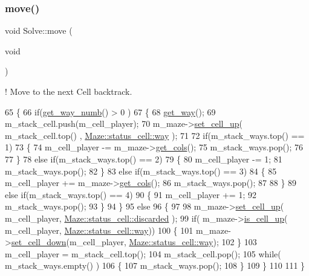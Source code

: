 \subsubsection{\texorpdfstring{move()}{move()}}
{\footnotesize\ttfamily void Solve\+::move (\begin{DoxyParamCaption}\item[{void}]{ }\end{DoxyParamCaption})}



! Move to the next Cell backtrack. 


\begin{DoxyCode}
65 \{
66     \textcolor{keywordflow}{if}(\hyperlink{classSolve_aaccff68d3e175f7400a9407077db7255}{get\_way\_numb}() > 0 )
67     \{
68         \hyperlink{classSolve_a963b593c0311f03c7e4ce77eea818fa1}{get\_way}();
69         m\_stack\_cell.push(m\_cell\_player);
70         m\_maze->\hyperlink{classMaze_aa7c832a91a3db8f48b31f688332f8986}{set\_cell\_up}( m\_stack\_cell.top() , 
      \hyperlink{classMaze_a07167e321eac2b67100fb82ecb98f1d1ac83b72dd001482ce10f0b106c7a0ed0e}{Maze::status\_cell::way} );
71 
72         \textcolor{keywordflow}{if}(m\_stack\_ways.top() == 1)
73         \{
74             m\_cell\_player -= m\_maze->\hyperlink{classMaze_a8a04cd1335e96a80358181afa164d4c9}{get\_cols}();
75             m\_stack\_ways.pop();
76 
77         \}
78         \textcolor{keywordflow}{else} \textcolor{keywordflow}{if}(m\_stack\_ways.top() == 2)
79         \{
80             m\_cell\_player -= 1;
81             m\_stack\_ways.pop();
82         \}
83         \textcolor{keywordflow}{else} \textcolor{keywordflow}{if}(m\_stack\_ways.top() == 3)
84         \{
85             m\_cell\_player += m\_maze->\hyperlink{classMaze_a8a04cd1335e96a80358181afa164d4c9}{get\_cols}();
86             m\_stack\_ways.pop();
87 
88         \}
89         \textcolor{keywordflow}{else} \textcolor{keywordflow}{if}(m\_stack\_ways.top() == 4)
90         \{
91             m\_cell\_player += 1;
92             m\_stack\_ways.pop();
93         \}
94     \}
95     \textcolor{keywordflow}{else}
96     \{
97 
98         m\_maze->\hyperlink{classMaze_aa7c832a91a3db8f48b31f688332f8986}{set\_cell\_up}( m\_cell\_player, 
      \hyperlink{classMaze_a07167e321eac2b67100fb82ecb98f1d1a94708897ec9db8647dfe695714c98e46}{Maze::status\_cell::discarded} );
99         \textcolor{keywordflow}{if}( m\_maze->\hyperlink{classMaze_a2b0e69e72d6c3e1037578f057946a21e}{is\_cell\_up}( m\_cell\_player, \hyperlink{classMaze_a07167e321eac2b67100fb82ecb98f1d1ac83b72dd001482ce10f0b106c7a0ed0e}{Maze::status\_cell::way}))
100         \{
101             m\_maze->\hyperlink{classMaze_ab86292a84aa56a26c4c07f4aa684d9bb}{set\_cell\_down}(m\_cell\_player, 
      \hyperlink{classMaze_a07167e321eac2b67100fb82ecb98f1d1ac83b72dd001482ce10f0b106c7a0ed0e}{Maze::status\_cell::way});
102         \}
103         m\_cell\_player = m\_stack\_cell.top();
104         m\_stack\_cell.pop();
105         \textcolor{keywordflow}{while}( m\_stack\_ways.empty() )
106         \{
107             m\_stack\_ways.pop();
108         \}
109     \}
110 
111 \}
\end{DoxyCode}

